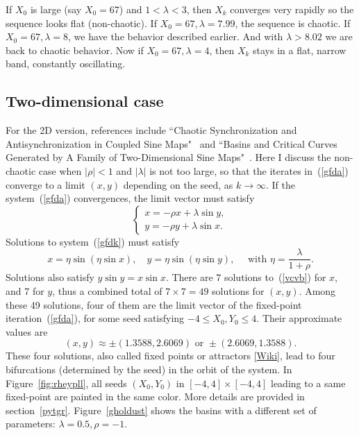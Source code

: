 \documentclass[oneside,10pt]{book}
\begin{document}
If $X_0$ is large (say $X_0=67$) and $1<\lambda<3$, then $X_k$ converges very rapidly so the sequence looks flat (non-chaotic). If $X_0=67,\lambda=7.99$, the sequence is chaotic. 
If $X_0=67,\lambda=8$, we have the behavior described earlier. And with 
$\lambda>8.02$ we are back to chaotic behavior. 
Now if $X_0=67,\lambda=4$, then $X_k$ stays in a flat, narrow band, constantly oscillating.


\subsection{Two-dimensional case}\label{sinere23jh}

For the 2D version, references include  
``Chaotic Synchronization and Antisynchronization in Coupled Sine Maps"~\cite{mama221} and 
``Basins and Critical Curves Generated by A Family of Two-Dimensional Sine Maps"~\cite{mavcx2}.
Here I discuss the non-chaotic case when $|\rho|<1$ and $|\lambda|$ is not too large, so that the 
 iterates in~(\ref{gfda}) converge to a limit $(x,y)$ depending on the seed, as $k\rightarrow\infty$.
 If the system~(\ref{gfda}) convergences, the limit vector must satisfy 
\begin{equation}
    \begin{cases} 
      x = -\rho x + \lambda \sin y, \\[3pt]
     y = -\rho y + \lambda \sin x. \label{gfdk}
    \end{cases} %
\end{equation}
Solutions to system~(\ref{gfdk}) must satisfy
\begin{equation}
 x=\eta\sin(\eta\sin x),\quad y=\eta\sin(\eta\sin y),  \quad\text{ with } \eta = \frac{\lambda}{1+\rho}. \label{vcvb} 
\end{equation}
Solutions also satisfy $y\sin y = x\sin x$.
There are 7 solutions to~(\ref{vcvb}) for $x$, and 7 for $y$, thus a combined total of $7\times 7 = 49$ solutions for $(x,y)$. Among 
 these 49 solutions, four of them are the limit vector of the fixed-point iteration~(\ref{gfda}), for some seed
  satisfying $-4\leq X_0,Y_0\leq 4$. Their  approximate values are
$$
(x, y)\approx \pm (1.3588, 2.6069) \text{ or }
\pm(2.6069, 1.3588).
$$
These four solutions, also called \textcolor{index}{fixed points} or \textcolor{index}{attractors} [\href{https://en.wikipedia.org/wiki/Attractor}{Wiki}], 
 lead to four \textcolor{index}{bifurcations} (determined by the seed) in the orbit of the system. 
In Figure~\ref{fig:rheypll}, all seeds $(X_0,Y_0)$ in $ [-4,4]\times [-4, 4]$ leading to a same fixed-point are painted in the same color.
More details are provided in section~\ref{pytgr}. Figure~\ref{gholdust} shows the basins with
 a different set of parameters: $\lambda=0.5,\rho=-1$.
\end{document}
